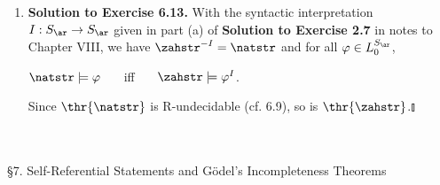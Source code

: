 \begin{enumerate}[1.]
%
\item \textbf{Solution to Exercise 6.13.} With the syntactic interpretation $I : S_\ar \to S_\ar$ given in part (a) of \textbf{Solution to Exercise 2.7} in notes to Chapter VIII, we have $\zahstr^{-I} = \natstr$ and for all $\varphi \in L_0^{S_\ar}$,
\begin{center}
$\natstr \models \varphi$ \ \ \ iff \ \ \ $\zahstr \models \varphi^I$.
\end{center}
Since $\thr{\natstr}$ is R-undecidable (cf. 6.9), so is $\thr{\zahstr}$.\nolinebreak\hfill$\talloblong$
\end{enumerate}
\
\\
\\
{\large \S7. Self-Referential Statements and G\"{o}del's Incompleteness Theorems}
